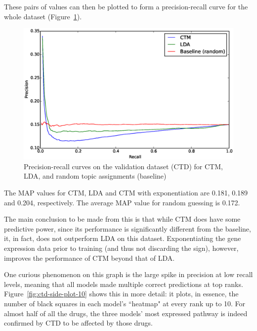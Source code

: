 \documentclass[12pt,a4paper,twoside,openright]{report}
\begin{document}
These pairs of values can then be plotted to form a precision-recall curve for the whole dataset (Figure~\ref{fig:ctd-pr-curves}).

\begin{figure}[!htb]
\includegraphics[width=\textwidth]{ctd-pr-curves.eps}
\caption{Precision-recall curves on the validation dataset (CTD) for CTM, LDA, and random topic assignments (baseline)}
\label{fig:ctd-pr-curves}
\end{figure}

The MAP values for CTM, LDA and CTM with exponentiation are 0.181, 0.189 and 0.204, respectively. The average MAP value for random guessing is 0.172.

The main conclusion to be made from this is that while CTM does have some predictive power, since its performance is significantly different from the baseline, it, in fact, does not outperform LDA on this dataset. Exponentiating the gene expression data prior to training (and thus not discarding the sign), however, improves the performance of CTM beyond that of LDA.

One curious phenomenon on this graph is the large spike in precision at low recall levels, meaning that all models made multiple correct predictions at top ranks. Figure~\ref{fig:ctd-side-plot-10} shows this in more detail: it plots, in essence, the number of black squares in each model's ``heatmap" at every rank up to 10. For almost half of all the drugs, the three models' most expressed pathway is indeed confirmed by CTD to be affected by those drugs.
\end{document}
